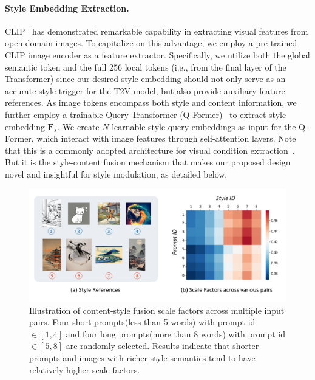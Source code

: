 \vspace{-0.3em}
\paragraph{Style Embedding Extraction.}
CLIP~\cite{radford2021learning} has demonstrated remarkable capability in extracting visual features from open-domain images. To capitalize on this advantage, we employ a pre-trained CLIP image encoder as a feature extractor. Specifically, we utilize both the global semantic token and the full $256$ local tokens (i.e., from the final layer of the Transformer) since our desired style embedding should not only serve as an accurate style trigger for the T2V model, but also provide auxiliary feature references.
As image tokens encompass both style and content information, we further employ a trainable Query Transformer (Q-Former)~\cite{li2023blip2} to extract style embedding $\mathbf{F}_s$. We create $N$ learnable style query embeddings as input for the Q-Former, which interact with image features through self-attention layers.
Note that this is a commonly adopted architecture for visual condition extraction~\cite{li2023blip2, shi2023instancebooth,ye2023ipadapter, xing2023dynamicrafter}. But it is the style-content fusion mechanism that makes our proposed design novel and insightful for style modulation, as detailed below.

\begin{figure}[t]
    \centering
    \includegraphics[width=\linewidth]{figures/scale_factor_viz.pdf}
    \vspace{-1.0cm}
    \caption{Illustration of content-style fusion scale factors across multiple input pairs. Four short prompts(less than 5 words) with prompt id $\in [1, 4]$ and four long prompts(more than 8 words) with prompt id $\in [5, 8]$ are randomly selected. Results indicate that shorter prompts and images with richer style-semantics tend to have relatively higher scale factors.} 
    \label{fig:scale_factor_viz}
    \vspace{-0.35cm}
\end{figure}

